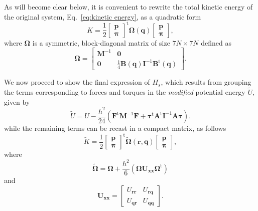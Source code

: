 \documentclass[
journal=jctcce,
layout=twocolumn
]{achemso}
\newcommand{\mt}[1]{\boldsymbol{\mathbf{#1}}}   %
\newcommand{\vt}[1]{\boldsymbol{\mathbf{#1}}}   %
\newcommand{\tr}[1]{#1^\text{t}}                %
\newcommand{\timestep}{h}
\newcommand{\modified}[1]{\widetilde{#1}}
\begin{document}
As will become clear below, it is convenient to rewrite the total kinetic energy of the original system, Eq.~\eqref{eq:kinetic energy}, as a quadratic form
\begin{equation*}
K = \frac{1}{2} \tr{ \left[\begin{array}{c} \vt p \\ \vt \pi \end{array}\right]} {\mt \Omega}(\vt q) \left[\begin{array}{c} \vt p \\ \vt \pi \end{array}\right],
\end{equation*}
where $\mt \Omega$ is a symmetric, block-diagonal matrix of size $7N \times 7N$ defined as
\begin{equation*}
{\mt \Omega} = \left[\begin{array}{cc}
{\mt M}^{-1} & \mt 0 \\
\mt 0 & \frac{1}{4} {\mt B}(\vt q) {\mt I}^{-1} \tr{\mt B}(\vt q)
\end{array}\right].
\end{equation*}

We now proceed to show the final expression of $H_s$, which results from grouping the terms corresponding to forces and torques in the \textit{modified} potential energy $\tilde{U}$, given by
\begin{equation*}
\modified U = U - \frac{\timestep^2}{24} \left( \tr{\vt F} {\mt M}^{-1} {\vt F} + \tr{\vt \tau} \tr{\mt A} {\mt I}^{-1} {\mt A} {\vt \tau} \right).
\end{equation*}
while the remaining terms can be recast in a compact matrix, as follows
\begin{equation*}
\modified K = \frac{1}{2} \tr{ \left[\begin{array}{c} \vt p \\ \vt \pi \end{array}\right]} \modified{\mathbf \Omega}(\vt r, \vt q) \left[\begin{array}{c} \vt p \\ \vt \pi \end{array}\right],
\end{equation*}
where
\begin{equation*}
\tilde{\mt \Omega} = {\mt \Omega} + \frac{\timestep^2}{6} \left( {\mt \Omega} {\mt U}_{\vt x \vt x} \tr{\mt \Omega} \right)
\end{equation*}
and
\begin{equation*}
{\mt U}_{\vt x \vt x} = \left[\begin{array}{cc}
U_{\vt r \vt r} & U_{\vt r \vt q} \\
U_{\vt q \vt r} & U_{\vt q \vt q}
\end{array}\right].
\end{equation*}
\end{document}
